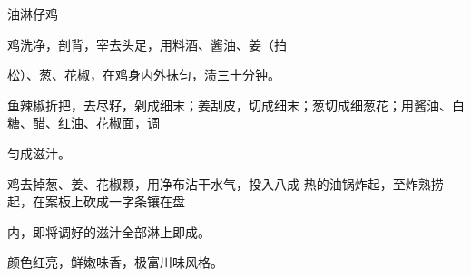\begin{recipe}{油淋仔鸡}

\ingredients


\cooking

\step 鸡洗净，剖背，宰去头足，用料酒、酱油、姜（拍

松）、葱、花椒，在鸡身内外抹匀，渍三十分钟。

\step 鱼辣椒折把，去尽籽，剁成细末；姜刮皮，切成细末；葱切成细葱花；用酱油、白糖、醋、红油、花椒面，调

匀成滋汁。

鸡去掉葱、姜、花椒颗，用净布沾干水气，投入八成 热的油锅炸起，至炸熟捞起，在案板上砍成一字条镶在盘

内，即将调好的滋汁全部淋上即成。

\notes

颜色红亮，鲜嫩味香，极富川味风格。

\end{recipe}

